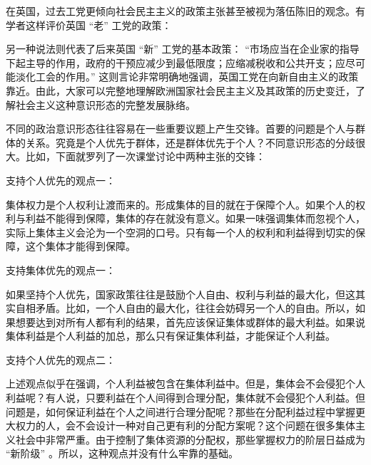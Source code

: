 在英国，过去工党更倾向社会民主主义的政策主张甚至被视为落伍陈旧的观念。有学者这样评价英国 “老” 工党的政策：


另一种说法则代表了后来英国 “新” 工党的基本政策： “市场应当在企业家的指导下起主导的作用，政府的干预应减少到最低限度；应缩减税收和公共开支；应尽可能淡化工会的作用。” 这则言论非常明确地强调，英国工党在向新自由主义的政策靠近。由此，大家可以完整地理解欧洲国家社会民主主义及其政策的历史变迁，了解社会主义这种意识形态的完整发展脉络。


不同的政治意识形态往往容易在一些重要议题上产生交锋。首要的问题是个人与群体的关系。究竟是个人优先于群体，还是群体优先于个人？不同意识形态的分歧很大。比如，下面就罗列了一次课堂讨论中两种主张的交锋：

支持个人优先的观点一：

集体权力是个人权利让渡而来的。形成集体的目的就在于保障个人。如果个人的权利与利益不能得到保障，集体的存在就没有意义。如果一味强调集体而忽视个人，实际上集体主义会沦为一个空洞的口号。只有每一个人的权利和利益得到切实的保障，这个集体才能得到保障。

支持集体优先的观点一：

如果坚持个人优先，国家政策往往是鼓励个人自由、权利与利益的最大化，但这其实自相矛盾。比如，一个人自由的最大化，往往会妨碍另一个人的自由。所以，如果想要达到对所有人都有利的结果，首先应该保证集体或群体的最大利益。如果说集体利益是个人利益的加总，那么只有保证集体利益，才能保证个人利益。

支持个人优先的观点二：

上述观点似乎在强调，个人利益被包含在集体利益中。但是，集体会不会侵犯个人利益呢？有人说，只要利益在个人间得到合理分配，集体就不会侵犯个人利益。但问题是，如何保证利益在个人之间进行合理分配呢？那些在分配利益过程中掌握更大权力的人，会不会设计一种对自己更有利的分配方案呢？这个问题在很多集体主义社会中非常严重。由于控制了集体资源的分配权，那些掌握权力的阶层日益成为 “新阶级” 。所以，这种观点并没有什么牢靠的基础。

